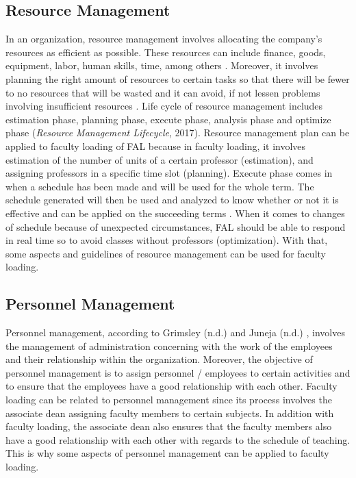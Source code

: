 \subsection{Resource Management}
In an organization, resource management involves allocating the company's resources as efficient as possible. These resources can include finance, goods, equipment, labor, human skills, time, among others \cite{ref:ResourceManagementBusinessDictionary}. Moreover, it involves planning the right amount of resources to certain tasks so that there will be fewer to no resources that will be wasted and it can avoid, if not lessen problems involving insufficient resources \cite{ref:ResourceManagementShopify}. Life cycle of resource management includes estimation phase, planning phase, execute phase, analysis phase and optimize phase (\textit{Resource Management Lifecycle}, 2017). Resource management plan can be applied to faculty loading of FAL because in faculty loading, it involves estimation of the number of units of a certain professor (estimation), and assigning professors in a specific time slot (planning). Execute phase comes in when a schedule has been made and will be used for the whole term. The schedule generated will then be used and analyzed to know whether or not it is effective and can be applied on the succeeding terms . When it comes to changes of schedule because of unexpected circumstances, FAL should be able to respond in real time so to avoid classes without professors (optimization). With that, some aspects and guidelines of resource management can be used for faculty loading.

\subsection{Personnel Management}
Personnel management, according to Grimsley (n.d.) \nocite{ref:PersonnelManagementGrimsley} and Juneja (n.d.) \nocite{ref:PersonnelManagementJuneja}, involves the management of administration concerning with the work of the employees and their relationship within the organization. Moreover, the objective of personnel management is to assign personnel / employees to certain activities and to ensure that the employees have a good relationship with each other. Faculty loading can be related to personnel management since its process involves the associate dean assigning faculty members to certain subjects. In addition with faculty loading, the associate dean also ensures that the faculty members also have a good relationship with each other with regards to the schedule of teaching. This is why some aspects of personnel management can be applied to faculty loading.

